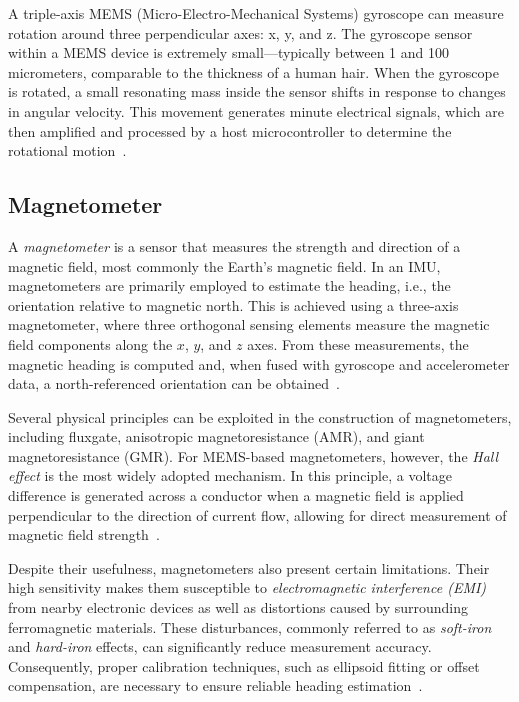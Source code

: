\documentclass[english, bachelor, utf8]{base/thesis_telematics}
\begin{document}
A triple-axis MEMS (Micro-Electro-Mechanical Systems) gyroscope can measure rotation around three perpendicular axes: x, y, and z. The gyroscope sensor within a MEMS device is extremely small—typically between 1 and 100 micrometers, comparable to the thickness of a human hair. 
When the gyroscope is rotated, a small resonating mass inside the sensor shifts in response to changes in angular velocity. 
This movement generates minute electrical signals, which are then amplified and processed by a host microcontroller to determine the rotational motion~\cite{sparkfun_gyroscope,Pedestrian}.
\subsection{Magnetometer}

A \textit{magnetometer} is a sensor that measures the strength and direction of a magnetic field, most commonly the Earth's magnetic field.
In an IMU, magnetometers are primarily employed to estimate the heading, i.e., the orientation relative to magnetic north. 
This is achieved using a three-axis magnetometer, where three orthogonal sensing elements measure the magnetic field components along the $x$, $y$, and $z$ axes. 
From these measurements, the magnetic heading is computed and, when fused with gyroscope and accelerometer data, a north-referenced orientation can be obtained~\cite{advnav_imu_intro}.  

Several physical principles can be exploited in the construction of magnetometers, including fluxgate, anisotropic magnetoresistance (AMR), and giant magnetoresistance (GMR). 
For MEMS-based magnetometers, however, the \textit{Hall effect} is the most widely adopted mechanism. In this principle, a voltage difference is generated across a conductor when a magnetic field is applied perpendicular to the direction of current flow, allowing for direct measurement of magnetic field strength~\cite{howtomechatronics}.  

Despite their usefulness, magnetometers also present certain limitations. Their high sensitivity makes them susceptible to \textit{electromagnetic interference (EMI)} from nearby electronic devices as well as distortions caused by surrounding ferromagnetic materials. 
These disturbances, commonly referred to as \textit{soft-iron} and \textit{hard-iron} effects, can significantly reduce measurement accuracy. Consequently, proper calibration techniques, such as ellipsoid fitting or offset compensation, are necessary to ensure reliable heading estimation~\cite{vectornav_mems_operation}.
\end{document}
